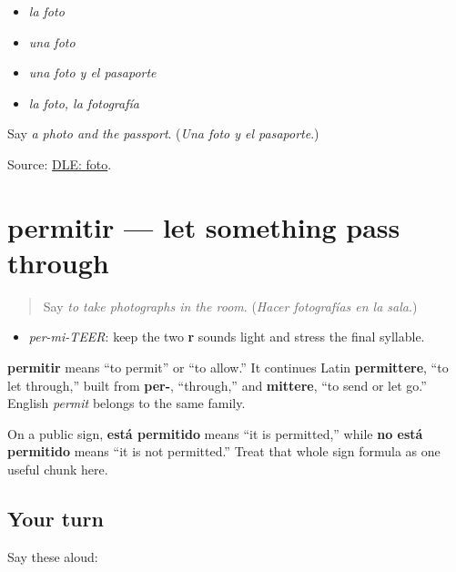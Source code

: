 \begin{itemize}
\raggedright
  \item \emph{la foto}
  \item \emph{una foto}
  \item \emph{una foto y el pasaporte}
  \item \emph{la foto, la fotografía}
\end{itemize}

\begin{tcolorbox}[breakable,colback=teal!4,colframe=teal!35!black,title={Before you move on}]
Say \emph{a photo and the passport}. (\emph{Una foto y el pasaporte}.)

Source: \href{https://dle.rae.es/foto}{DLE: foto}.
\end{tcolorbox}
\section[permitir]{permitir — let something pass through}

\label{lesson:ES-C405-permitir}



\begin{quote}
Say \emph{to take photographs in the room}. (\emph{Hacer fotografías en la sala}.)
\end{quote}

\begin{sounds}
\begin{itemize}
\raggedright
  \item \emph{per-mi-TEER}: keep the two \textbf{r} sounds light and stress the final syllable.
\end{itemize}
\end{sounds}

\begin{cousinweb}
\textbf{permitir} means “to permit” or “to allow.” It continues Latin \textbf{permittere}, “to let through,” built from \textbf{per-}, “through,” and \textbf{mittere}, “to send or let go.” English \emph{permit} belongs to the same family.

On a public sign, \textbf{está permitido} means “it is permitted,” while \textbf{no está permitido} means “it is not permitted.” Treat that whole sign formula as one useful chunk here.
\end{cousinweb}

\subsection*{Your turn}
Say these aloud:

